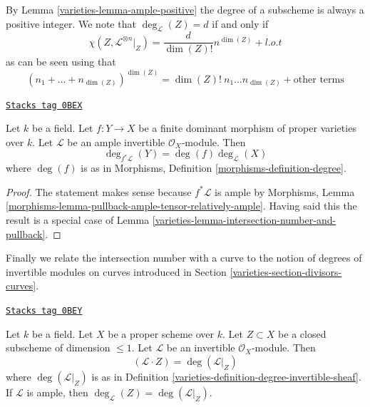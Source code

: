 By Lemma \ref{varieties-lemma-ample-positive} the degree of a subscheme is always a
positive integer. We note that $\deg_\mathcal{L}(Z) = d$ if and only if
$$
\chi(Z, \mathcal{L}^{\otimes n}|_Z) = \frac{d}{\dim(Z)!} n^{\dim(Z)} + l.o.t
$$
as can be seen using that
$$
(n_1 + \ldots + n_{\dim(Z)})^{\dim(Z)} =
\dim(Z)!\ n_1 \ldots n_{\dim(Z)} + \text{other terms}
$$

\begin{lemma}
\label{varieties-lemma-degree-finite-morphism-in-terms-degrees}
\href{https://stacks.math.columbia.edu/tag/0BEX}{\texttt{Stacks tag 0BEX}}

Let $k$ be a field. Let $f : Y \to X$ be a finite
dominant morphism of proper varieties over $k$. Let $\mathcal{L}$
be an ample invertible $\mathcal{O}_X$-module.
Then
$$
\deg_{f^*\mathcal{L}}(Y) = \deg(f) \deg_\mathcal{L}(X)
$$
where $\deg(f)$ is as in
Morphisms, Definition \ref{morphisms-definition-degree}.
\end{lemma}

\begin{proof}

The statement makes sense because $f^*\mathcal{L}$ is ample by
Morphisms, Lemma \ref{morphisms-lemma-pullback-ample-tensor-relatively-ample}.
Having said this the result is a special case of
Lemma \ref{varieties-lemma-intersection-number-and-pullback}.
\end{proof}

Finally we relate the intersection number with a curve to the notion
of degrees of invertible modules on curves introduced in
Section \ref{varieties-section-divisors-curves}.

\begin{lemma}
\label{varieties-lemma-intersection-numbers-and-degrees-on-curves}
\href{https://stacks.math.columbia.edu/tag/0BEY}{\texttt{Stacks tag 0BEY}}

Let $k$ be a field. Let $X$ be a proper scheme over $k$.
Let $Z \subset X$ be a closed subscheme of dimension $\leq 1$.
Let $\mathcal{L}$ be an invertible $\mathcal{O}_X$-module.
Then
$$
(\mathcal{L} \cdot Z) = \deg(\mathcal{L}|_Z)
$$
where $\deg(\mathcal{L}|_Z)$ is as in
Definition \ref{varieties-definition-degree-invertible-sheaf}.
If $\mathcal{L}$ is ample, then
$\deg_\mathcal{L}(Z) = \deg(\mathcal{L}|_Z)$.
\end{lemma}

